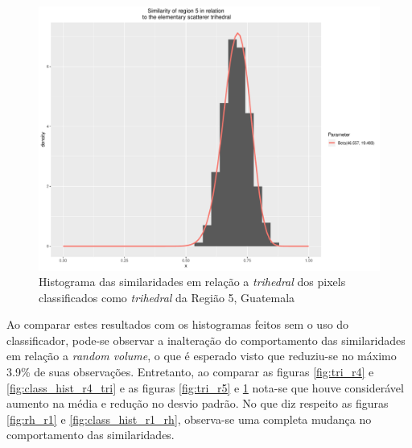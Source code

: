 \documentclass[12pt]{article}
\begin{document}
\begin{figure}[!h]
    \centering    
    \includegraphics[width = 0.8\linewidth]{../../Images/Report_18_12_20/Classifier_Geo_Dist/Histograms/Guate/region5_tri_sm_filter.pdf}
    \caption{Histograma das similaridades em relação a \textit{trihedral} dos pixels classificados como \textit{trihedral} da Região 5, Guatemala}
    \label{fig:class_hist_r5_tri}
\end{figure}

Ao comparar estes resultados com os histogramas feitos sem o uso do classificador, pode-se observar a inalteração do comportamento das similaridades em relação a \textit{random volume}, o que é esperado visto que reduziu-se no máximo 3.9\% de suas observações. Entretanto, ao comparar as figuras \ref{fig:tri_r4} e \ref{fig:class_hist_r4_tri} e as figuras \ref{fig:tri_r5} e \ref{fig:class_hist_r5_tri} nota-se que houve considerável aumento na média e redução no desvio padrão. No que diz respeito as figuras \ref{fig:rh_r1} e \ref{fig:class_hist_r1_rh}, observa-se uma completa mudança no comportamento das similaridades.



\end{document}
